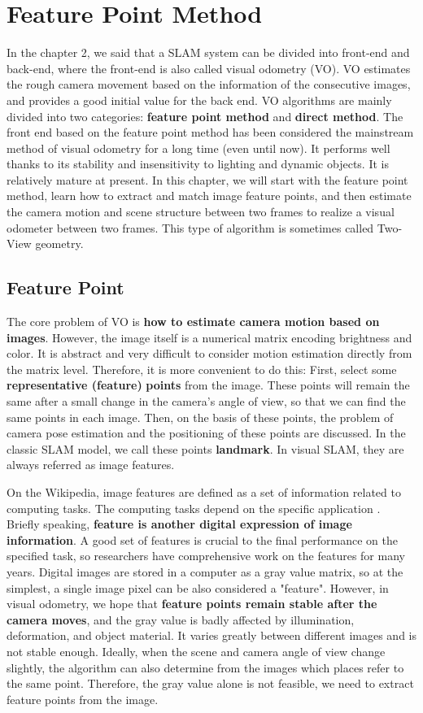 \section{Feature Point Method}
In the chapter 2, we said that a SLAM system can be divided into front-end and back-end, where the front-end is also called visual odometry (VO). VO estimates the rough camera movement based on the information of the consecutive images, and provides a good initial value for the back end. VO algorithms are mainly divided into two categories: \textbf{feature point method} and \textbf{direct method}. The front end based on the feature point method has been considered the mainstream method of visual odometry for a long time (even until now). It performs well thanks to its stability and insensitivity to lighting and dynamic objects. It is relatively mature at present. In this chapter, we will start with the feature point method, learn how to extract and match image feature points, and then estimate the camera motion and scene structure between two frames to realize a visual odometer between two frames. This type of algorithm is sometimes called Two-View geometry.

\subsection{Feature Point}

The core problem of VO is \textbf{how to estimate camera motion based on images}. However, the image itself is a numerical matrix encoding brightness and color. It is abstract and very difficult to consider motion estimation directly from the matrix level. Therefore, it is more convenient to do this: First, select some \textbf{representative (feature)} \textbf{points} from the image. These points will remain the same after a small change in the camera's angle of view, so that we can find the same points in each image. Then, on the basis of these points, the problem of camera pose estimation and the positioning of these points are discussed. In the classic SLAM model, we call these points \textbf{landmark}. In visual SLAM, they are always referred as image features.

On the Wikipedia, image features are defined as a set of information related to computing tasks. The computing tasks depend on the specific application \textsuperscript{\cite{wiki:featurecv}}. Briefly speaking, \textbf{feature is another digital expression of image information}. A good set of features is crucial to the final performance on the specified task, so researchers have comprehensive work on the features for many years. Digital images are stored in a computer as a gray value matrix, so at the simplest, a single image pixel can be also considered a "feature". However, in visual odometry, we hope that \textbf{feature points remain stable after the camera moves}, and the gray value is badly affected by illumination, deformation, and object material. It varies greatly between different images and is not stable enough. Ideally, when the scene and camera angle of view change slightly, the algorithm can also determine from the images which places refer to the same point. Therefore, the gray value alone is not feasible, we need to extract feature points from the image.

